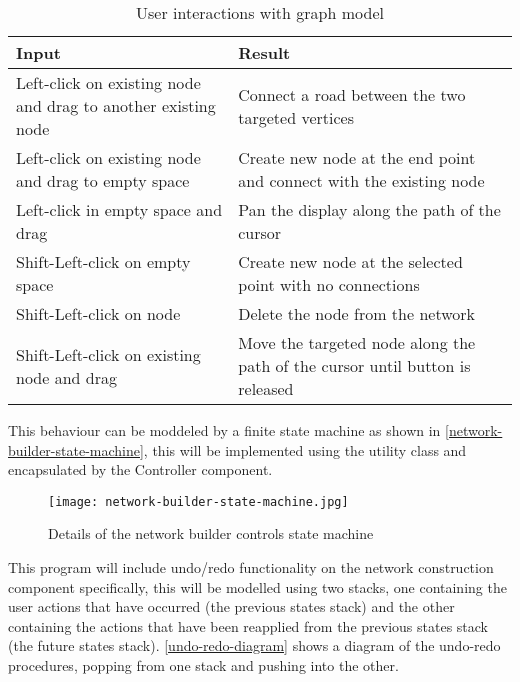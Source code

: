     \begin{table}
        \centering
        \begin{tabular}{|p{}|p{}|}
            \hline
            \textbf{Input} & \textbf{Result}\\
            \hline
            Left-click on existing node and drag to another existing node & Connect a road between the two targeted vertices\\\hline
            Left-click on existing node and drag to empty space & Create new node at the end point and connect with the existing node\\\hline
            Left-click in empty space and drag & Pan the display along the path of the cursor\\\hline
            Shift-Left-click on empty space & Create new node at the selected point with no connections\\\hline
            Shift-Left-click on node & Delete the node from the network\\\hline
            Shift-Left-click on existing node and drag & Move the targeted node along the path of the cursor until button is released\\\hline
        \end{tabular}
        \caption{User interactions with graph model}
        \label{user-interaction-specification}
    \end{table}

    This behaviour can be moddeled by a finite state machine as shown in \autoref{network-builder-state-machine}, this will be implemented using the  utility class and encapsulated by the Controller component.

    \begin{figure}
        \centering
        \texttt{[image: network-builder-state-machine.jpg]}
        \caption{Details of the network builder controls state machine}
        \label{network-builder-state-machine}
    \end{figure}

    This program will include undo/redo functionality on the network construction component specifically, this will be modelled using two stacks, one containing the user actions that have occurred (the previous states stack) and the other containing the actions that have been reapplied from the previous states stack (the future states stack). \autoref{undo-redo-diagram} shows a diagram of the undo-redo procedures, popping from one stack and pushing into the other.

